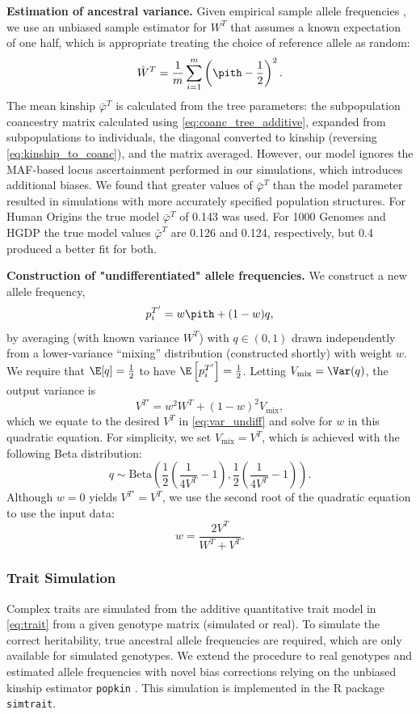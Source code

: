 \documentclass[11pt]{article}
\begin{document}
\textbf{Estimation of ancestral variance.}
Given empirical sample allele frequencies \pith, we use an unbiased sample estimator for $W^T$ that assumes a known expectation of one half, which is appropriate treating the choice of reference allele as random:
$$
\hat{W}^T
=
\frac{1}{m} \sum_{i=1}^m \left( \pith - \frac{1}{2} \right)^2
.
$$
The mean kinship $\bar{\varphi}^T$ is calculated from the tree parameters: the subpopulation coancestry matrix calculated using \cref{eq:coanc_tree_additive}, expanded from subpopulations to individuals, the diagonal converted to kinship (reversing \cref{eq:kinship_to_coanc}), and the matrix averaged.
However, our model ignores the MAF-based locus ascertainment performed in our simulations, which introduces additional biases.
We found that greater values of $\bar{\varphi}^T$ than the model parameter resulted in simulations with more accurately specified population structures.
For Human Origins the true model $\bar{\varphi}^T$ of 0.143 was used.
For 1000 Genomes and HGDP the true model values $\bar{\varphi}^T$ are 0.126 and 0.124, respectively, but 0.4 produced a better fit for both.

\textbf{Construction of "undifferentiated" allele frequencies.}
We construct a new allele frequency,
$$
p_i^{T'} = w \pith + ( 1 - w ) q,
$$
by averaging \pith (with known variance $W^T$) with $q \in (0, 1)$ drawn independently from a lower-variance ``mixing'' distribution (constructed shortly) with weight $w$.
We require that $\E[q] = \frac{1}{2}$ to have $\E \left[ p_i^{T'} \right] = \frac{1}{2}$.
Letting $V_\text{mix} = \Var(q)$, the output variance is
$$
V^{T'}
=
w^2 W^T + (1-w)^2 V_\text{mix}
,
$$
which we equate to the desired $V^T$ in \cref{eq:var_undiff} and solve for $w$ in this quadratic equation.
For simplicity, we set $V_\text{mix} = V^T$, which is achieved with the following Beta distribution:
$$
q \sim \text{Beta} \left( \frac{1}{2} \left( \frac{1}{ 4 V^T } - 1 \right), \frac{1}{2} \left( \frac{1}{ 4 V^T } - 1 \right) \right)
.
$$
Although $w=0$ yields $V^{T'} = V^T$, we use the second root of the quadratic equation to use the input \pith data:
$$
w = \frac{ 2 V^T }{ W^T + V^T }.
$$

\subsubsection{Trait Simulation}

Complex traits are simulated from the additive quantitative trait model in \cref{eq:trait} from a given genotype matrix (simulated or real).
To simulate the correct heritability, true ancestral allele frequencies \pit are required, which are only available for simulated genotypes.
We extend the procedure to real genotypes and estimated allele frequencies \pith with novel bias corrections relying on the unbiased kinship estimator \texttt{popkin} \citep{ochoa_estimating_2021}.
This simulation is implemented in the R package \texttt{simtrait}.
\end{document}
